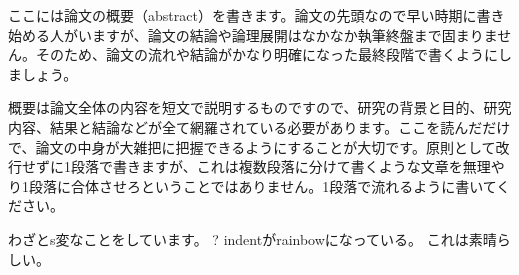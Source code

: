 ここには論文の概要（abstract）を書きます。論文の先頭なので早い時期に書き始める人がいますが、論文の結論や論理展開はなかなか執筆終盤まで固まりません。そのため、論文の流れや結論がかなり明確になった最終段階で書くようにしましょう。

概要は論文全体の内容を短文で説明するものですので、研究の背景と目的、研究内容、結果と結論などが全て網羅されている必要があります。ここを読んだだけで、論文の中身が大雑把に把握できるようにすることが大切です。原則として改行せずに1段落で書きますが、これは複数段落に分けて書くような文章を無理やり1段落に合体させろということではありません。1段落で流れるように書いてください。

わざとs変なことをしています。\cite{Okumura2005}
?
    indentがrainbowになっている。
        これは素晴らしい。

